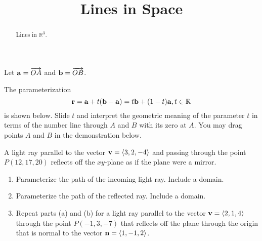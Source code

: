 \documentclass{ximera}
\title{Lines in Space}
\begin{document}
\begin{abstract}
Lines in $\mathbb{R}^3$.
\end{abstract}
\maketitle


\begin{exploration}   \label{Exsd67g:Line}
Let ${\bf a} = \overrightarrow{OA}$ and  ${\bf b} = \overrightarrow{OB}$.

The parameterization 
\[
    {\bf r} = {\bf a} + t({\bf b} - {\bf a}) = t{\bf b} + (1-t){\bf a} , t\in \mathbb{R}
\]
is shown below. Slide $t$ and interpret the geometric meaning of the parameter $t$ in terms of the number line through $A$ and $B$ with its zero at $A$. You may drag points $A$ and $B$ in the demonstration below.

 
\begin{onlineOnly}
    \begin{center}
\end{center}
\end{onlineOnly}

\end{exploration}


\begin{question}  \label{Qdr5577:Lines}
A light ray parallel to the vector ${\bf v} = \langle 3,2,-4 \rangle$ and passing through the point $P(12, 17,20)$ reflects off the $xy$-plane as if the plane were a mirror.

\begin{enumerate}

\item Parameterize the path of the incoming light ray. Include a domain.

\item Parameterize the path of the reflected ray. Include a domain.

\item Repeat parts (a) and (b) for a light ray parallel to the vector ${\bf v} = \langle 2,1,4 \rangle$ through the point $P(-1,3,-7)$ that reflects off the plane through the origin that is normal to the vector ${\bf n} = \langle  1, -1, 2 \rangle$.

\end{enumerate}

\end{question}
\end{document}
